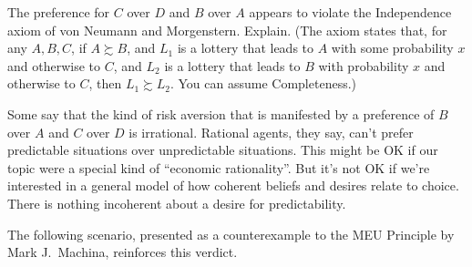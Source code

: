 \begin{exercise}{3}
  The preference for $C$ over $D$ and $B$ over $A$ appears to violate the
  Independence axiom of von Neumann and Morgenstern. Explain. (The axiom states
  that, for any $A, B, C$, if $A \succsim B$, and $L_1$ is a lottery
  that leads to $A$ with some probability $x$ and otherwise to $C$, and $L_2$ is
  a lottery that leads to $B$ with probability $x$ and otherwise to $C$, then
  $L_1 \succsim L_2$. You can assume Completeness.)
\end{exercise}



Some say that the kind of risk aversion that is manifested by a preference of
$B$ over $A$ and $C$ over $D$ is irrational. Rational agents, they say, can't
prefer predictable situations over unpredictable situations. This might be OK if
our topic were a special kind of ``economic rationality''. But it's not OK if
we're interested in a general model of how coherent beliefs and desires relate
to choice. There is nothing incoherent about a desire for predictability.

The following scenario, presented as a counterexample to the MEU Principle by
Mark J.\ Machina, reinforces this verdict.

